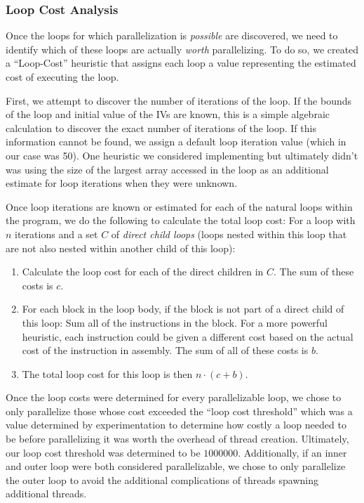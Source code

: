 \documentclass[11pt]{article}
\begin{document}
\subsubsection {Loop Cost Analysis} 

Once the loops for which parallelization is \emph{possible} are
discovered, we need to identify which of these loops are actually
\emph{worth} parallelizing. To do so, we created a ``Loop-Cost''
heuristic that assigns each loop a value representing the
estimated cost of executing the loop. 

First, we attempt to discover the number of iterations of the loop. If
the bounds of the loop and initial value of the IVs are known, this is
a simple algebraic calculation to discover the exact number of
iterations of the loop. If this information cannot be found, we
assign a default loop iteration value (which in our case was 50). One
heuristic we considered implementing but ultimately didn't was using
the size of the largest array accessed in the loop as an additional
estimate for loop iterations when they were unknown. 

Once loop iterations are known or estimated for each of the natural loops
within the program, we do the following to calculate the total loop
cost: For a loop with $n$ iterations and a set $C$ of \emph{direct child
  loops} (loops nested within this loop that are not also nested
within another child of this loop): 

\begin{enumerate}

\item Calculate the loop cost for each of the direct children in
  $C$. The sum of these costs is $c$. 

\item For each block in the loop body, if the block is not part of a
  direct child of this loop: Sum all of the instructions in the
  block. For a more powerful heuristic, each instruction could be
  given a different cost based on the actual cost of the instruction
  in assembly. The sum of all of these costs is $b$. 

\item The total loop cost for this loop is then $n\cdot (c+b)$. 

\end{enumerate}

Once the loop costs were determined for every parallelizable loop, we
chose to only parallelize those whose cost exceeded the ``loop cost
threshold'' which was a value determined by experimentation to
determine how costly a loop needed to be before parallelizing it was
worth the overhead of thread creation. Ultimately, our loop cost
threshold was determined to be $1000000$. Additionally, if an inner
and outer loop were both considered parallelizable, we chose to only
parallelize the outer loop to avoid the additional complications of
threads spawning additional threads. 
\end{document}
